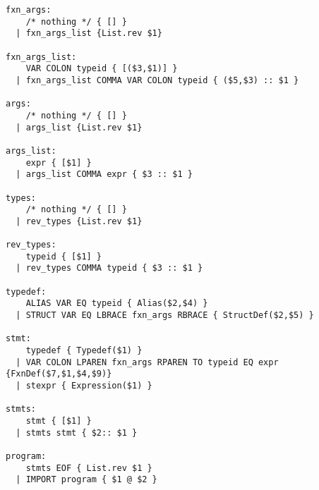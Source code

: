 \documentclass[main.tex]{subfiles}
\begin{document}
\begin{lstlisting}
fxn_args:
    /* nothing */ { [] }
  | fxn_args_list {List.rev $1}

fxn_args_list:
    VAR COLON typeid { [($3,$1)] }
  | fxn_args_list COMMA VAR COLON typeid { ($5,$3) :: $1 }

args:
    /* nothing */ { [] }
  | args_list {List.rev $1}

args_list:
    expr { [$1] }
  | args_list COMMA expr { $3 :: $1 }

types:
    /* nothing */ { [] }
  | rev_types {List.rev $1}

rev_types:
    typeid { [$1] }
  | rev_types COMMA typeid { $3 :: $1 }

typedef:
    ALIAS VAR EQ typeid { Alias($2,$4) }
  | STRUCT VAR EQ LBRACE fxn_args RBRACE { StructDef($2,$5) }

stmt:
    typedef { Typedef($1) }
  | VAR COLON LPAREN fxn_args RPAREN TO typeid EQ expr {FxnDef($7,$1,$4,$9)}
  | stexpr { Expression($1) }

stmts:
    stmt { [$1] }
  | stmts stmt { $2:: $1 }

program:
    stmts EOF { List.rev $1 }
  | IMPORT program { $1 @ $2 }
\end{lstlisting}
\end{document}
